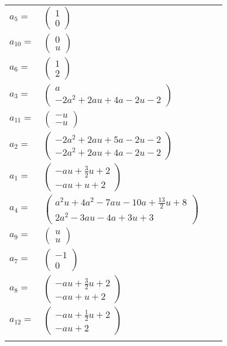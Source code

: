 \documentclass[1p]{elsarticle_modified}
\theoremstyle{definition}
\begin{document}
\begin{tabular}{m{7pt} m{180pt} m{7pt} m{180pt} }
\flushright $a_{5}=$&$\begin{pmatrix}1\\0\end{pmatrix}$ \\
\flushright $a_{10}=$&$\begin{pmatrix}0\\u\end{pmatrix}$ \\
\flushright $a_{6}=$&$\begin{pmatrix}1\\2\end{pmatrix}$ \\
\flushright $a_{3}=$&$\begin{pmatrix}a\\-2 a^2+2 a u+4 a-2 u-2\end{pmatrix}$ \\
\flushright $a_{11}=$&$\begin{pmatrix}- u\\- u\end{pmatrix}$ \\
\flushright $a_{2}=$&$\begin{pmatrix}-2 a^2+2 a u+5 a-2 u-2\\-2 a^2+2 a u+4 a-2 u-2\end{pmatrix}$ \\
\flushright $a_{1}=$&$\begin{pmatrix}- a u+\frac{3}{2} u+2\\- a u+u+2\end{pmatrix}$ \\
\flushright $a_{4}=$&$\begin{pmatrix}a^2 u+4 a^2-7 a u-10 a+\frac{13}{2} u+8\\2 a^2-3 a u-4 a+3 u+3\end{pmatrix}$ \\
\flushright $a_{9}=$&$\begin{pmatrix}u\\u\end{pmatrix}$ \\
\flushright $a_{7}=$&$\begin{pmatrix}-1\\0\end{pmatrix}$ \\
\flushright $a_{8}=$&$\begin{pmatrix}- a u+\frac{3}{2} u+2\\- a u+u+2\end{pmatrix}$ \\
\flushright $a_{12}=$&$\begin{pmatrix}- a u+\frac{1}{2} u+2\\- a u+2\end{pmatrix}$\\&\end{tabular}
\end{document}
